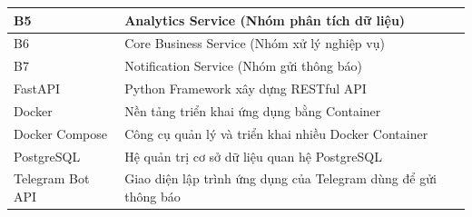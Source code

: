 \begin{table}[H]
\begin{tabular}{|p{4cm}|p{10cm}|}
B5 & Analytics Service (Nhóm phân tích dữ liệu) \\
\hline

B6 & Core Business Service (Nhóm xử lý nghiệp vụ) \\
\hline

B7 & Notification Service (Nhóm gửi thông báo) \\
\hline

FastAPI & Python Framework xây dựng RESTful API \\
\hline

Docker & Nền tảng triển khai ứng dụng bằng Container \\
\hline

Docker Compose & Công cụ quản lý và triển khai nhiều Docker Container \\
\hline

PostgreSQL & Hệ quản trị cơ sở dữ liệu quan hệ PostgreSQL \\
\hline

Telegram Bot API & Giao diện lập trình ứng dụng của Telegram dùng để gửi thông báo \\
\hline

\end{tabular}
\end{table}
